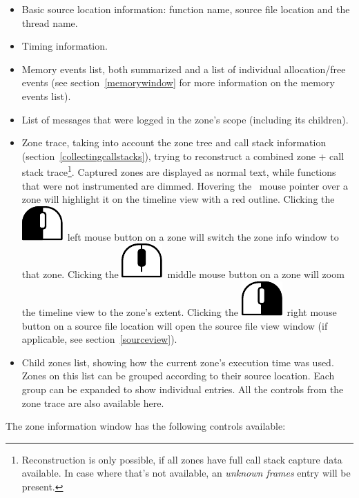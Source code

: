 \documentclass[hidelinks,titlepage,a4paper]{article}
\newcommand{\LMB}{\includegraphics[height=.8\baselineskip]{icons/lmb}}
\newcommand{\RMB}{\includegraphics[height=.8\baselineskip]{icons/rmb}}
\newcommand{\MMB}{\includegraphics[height=.8\baselineskip]{icons/mmb}}
\begin{document}
\begin{itemize}
\item Basic source location information: function name, source file location and the thread name.
\item Timing information.
\item Memory events list, both summarized and a list of individual allocation/free events (see section~\ref{memorywindow} for more information on the memory events list).
\item List of messages that were logged in the zone's scope (including its children).
\item Zone trace, taking into account the zone tree and call stack information (section~\ref{collectingcallstacks}), trying to reconstruct a combined zone + call stack trace\footnote{Reconstruction is only possible, if all zones have full call stack capture data available. In case where that's not available, an \emph{unknown frames} entry will be present.}. Captured zones are displayed as normal text, while functions that were not instrumented are dimmed. Hovering the \faMousePointer{}~mouse pointer over a zone will highlight it on the timeline view with a red outline. Clicking the \LMB{}~left mouse button on a zone will switch the zone info window to that zone. Clicking the \MMB{}~middle mouse button on a zone will zoom the timeline view to the zone's extent. Clicking the \RMB{}~right mouse button on a source file location will open the source file view window (if applicable, see section~\ref{sourceview}).
\item Child zones list, showing how the current zone's execution time was used. Zones on this list can be grouped according to their source location. Each group can be expanded to show individual entries. All the controls from the zone trace are also available here.
\end{itemize}

The zone information window has the following controls available:
\end{document}
